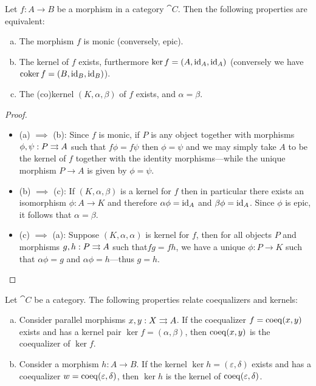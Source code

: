 \begin{proposition}
\label{prop:(co)kernel-properties}
Let \(f: A \to B\) be a morphism in a category \(\cat C\). Then the following
properties are equivalent:
\begin{enumerate}[(a)]\setlength\itemsep{0em}
\item The morphism \(f\) is monic (conversely, epic).
\item The kernel of \(f\) exists, furthermore \(\ker f = (A, \operatorname{id}_A, \operatorname{id}_A)\)
  (conversely we have \(\operatorname{coker} f = (B, \operatorname{id}_B, \operatorname{id}_B)\)).
\item The (co)kernel \((K, \alpha, \beta)\) of \(f\) exists, and
  \(\alpha = \beta\).
\end{enumerate}
\end{proposition}

\begin{proof}
\begin{itemize}\setlength\itemsep{0em}
\item (a) \(\implies\) (b): Since \(f\) is monic, if \(P\) is any object
  together with morphisms \(\phi, \psi: P \rightrightarrows A\) such that
  \(f \phi = f \psi\) then \(\phi = \psi\) and we may simply take \(A\) to be
  the kernel of \(f\) together with the identity morphisms---while the unique
  morphism \(P \to A\) is given by \(\phi = \psi\).

\item (b) \(\implies\) (c): If \((K, \alpha, \beta)\) is a kernel for \(f\) then
  in particular there exists an isomorphism \(\phi: A \to K\) and therefore
  \(\alpha \phi = \operatorname{id}_A\) and \(\beta \phi = \operatorname{id}_A\). Since \(\phi\) is
  epic, it follows that \(\alpha = \beta\).

\item (c) \(\implies\) (a): Suppose \((K, \alpha, \alpha)\) is kernel for \(f\),
  then for all objects \(P\) and morphisms \(g, h: P \rightrightarrows A\) such that\(f g =
  f h\), we have a unique \(\phi: P \to K\) such that \(\alpha \phi = g\) and
  \(\alpha \phi = h\)---thus \(g = h\).
\end{itemize}
\end{proof}

\begin{proposition}
\label{prop:coeq-and-ker}
Let \(\cat C\) be a category. The
following properties relate coequalizers and kernels:
\begin{enumerate}[(a)]\setlength\itemsep{0em}
\item Consider parallel morphisms \(x, y: X \rightrightarrows A\). If the coequalizer
  \(f = \operatorname{coeq}(x, y)\) exists and has a kernel pair \(\ker f = (\alpha, \beta)\),
  then \(\operatorname{coeq}(x, y)\) is the coequalizer of \(\ker f\).

\item Consider a morphism \(h: A \to B\). If the kernel
  \(\ker h = (\varepsilon, \delta)\) exists and has a coequalizer
  \(w = \operatorname{coeq}(\varepsilon, \delta)\), then \(\ker h\) is the kernel of
  \(\operatorname{coeq}(\varepsilon, \delta)\).
\end{enumerate}
\end{proposition}


